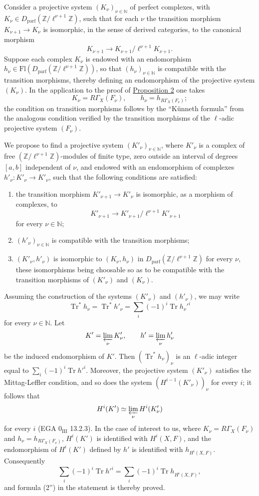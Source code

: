 \documentclass[11pt]{article}
\providecommand{\Tr}{\operatorname{Tr}}
\providecommand{\Tr}{\operatorname{Tr}}
\providecommand{\Tr}{\operatorname{Tr}}
\providecommand{\Tr}{\operatorname{Tr}}
\providecommand{\Tr}{\operatorname{Tr}}
\begin{document}
Consider a projective system $(K_\nu)_{\nu\in\mathbb N}$ of perfect complexes, with $K_\nu\in D_{\mathrm{parf}}(\mathbb Z/\ell^{\nu+1}\mathbb Z)$, such that for each $\nu$ the transition morphism $K_{\nu+1}\to K_\nu$ is isomorphic, in the sense of derived categories, to the canonical morphism
\[
K_{\nu+1}\to K_{\nu+1}/\ell^{\nu+1}K_{\nu+1}.
\]
Suppose each complex $K_\nu$ is endowed with an endomorphism $h_\nu\in\mathrm{Fl}(D_{\mathrm{parf}}(\mathbb Z/\ell^{\nu+1}\mathbb Z))$, so that $(h_\nu)_{\nu\in\mathbb N}$ is compatible with the transition morphisms, thereby defining an endomorphism of the projective system $(K_\nu)$. In the application to the proof of \hyperref[sga5:XV:proposition:2:3]{Proposition 2} one takes
\[
K_\nu=R\Gamma_X(F_\nu),\qquad h_\nu=h_{R\Gamma_X(F_\nu)};
\]
the condition on transition morphisms follows by the ``Künneth formula'' from the analogous condition verified by the transition morphisms of the $\ell$-adic projective system $(F_\nu)$.

We propose to find a projective system $(K'_\nu)_{\nu\in\mathbb N}$, where $K'_\nu$ is a complex of free $(\mathbb Z/\ell^{\nu+1}\mathbb Z)$-modules of finite type, zero outside an interval of degrees $[a,b]$ independent of $\nu$, and endowed with an endomorphism of complexes $h'_\nu:K'_\nu\to K'_\nu$, such that the following conditions are satisfied:
\begin{enumerate}[label=\arabic*)]
\item the transition morphism $K'_{\nu+1}\to K'_\nu$ is isomorphic, as a morphism of complexes, to
\[
K'_{\nu+1}\to K'_{\nu+1}/\ell^{\nu+1}K'_{\nu+1}
\]
for every $\nu\in\mathbb N$;
\item $(h'_\nu)_{\nu\in\mathbb N}$ is compatible with the transition morphisms;
\item $(K'_\nu,h'_\nu)$ is isomorphic to $(K_\nu,h_\nu)$ in $D_{\mathrm{parf}}(\mathbb Z/\ell^{\nu+1}\mathbb Z)$ for every $\nu$, these isomorphisms being choosable so as to be compatible with the transition morphisms of $(K'_\nu)$ and $(K_\nu)$.
\end{enumerate}
Assuming the construction of the systems $(K'_\nu)$ and $(h'_\nu)$, we may write
\[
\Tr^*h_\nu=\Tr^*h'_\nu=\sum_i(-1)^i\Tr h_\nu'^i
\]
for every $\nu\in\mathbb N$. Let
\[
K'=\varprojlim_\nu K'_\nu,
\qquad h'=\varprojlim_\nu h'_\nu
\]
be the induced endomorphism of $K'$. Then $(\Tr^*h_\nu)_\nu$ is an $\ell$-adic integer equal to $\sum_i(-1)^i\Tr h'^i$. Moreover, the projective system $(K'_\nu)$ satisfies the Mittag-Leffler condition, and so does the system $(H^{i-1}(K'_\nu))_\nu$ for every $i$; it follows that
\[
H^i(K')\simeq\varprojlim_\nu H^i(K'_\nu)
\]
for every $i$ (EGA $0_{\mathrm{III}}$ 13.2.3). In the case of interest to us, where $K_\nu=R\Gamma_X(F_\nu)$ and $h_\nu=h_{R\Gamma_X(F_\nu)}$, $H^i(K')$ is identified with $H^i(X,F)$, and the endomorphism of $H^i(K')$ defined by $h'$ is identified with $h_{H^i(X,F)}$. Consequently
\[
\sum_i(-1)^i\Tr h'^i=
\sum_i(-1)^i\Tr h_{H^i(X,F)},
\]
and formula (2'') in the statement is thereby proved.
\end{document}
